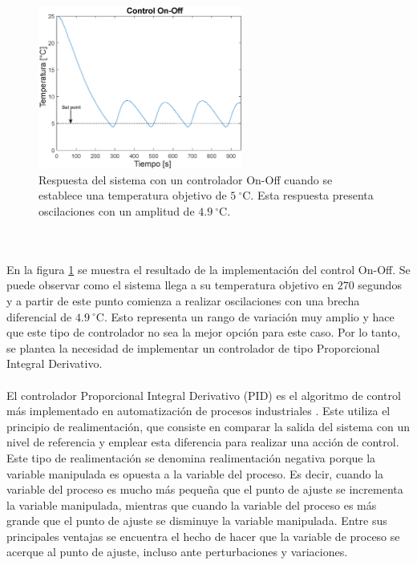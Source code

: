 \begin{figure}[h!]
\begin{centering}
  \includegraphics[width=0.6\textwidth]{Images/ControlOnOff.eps}
    \caption{Respuesta del sistema con un controlador On-Off cuando se establece una temperatura objetivo de $5~^\circ \mbox{C}$. Esta respuesta presenta oscilaciones con un amplitud de $4.9~^\circ \mbox{C}$.}
    \label{fig:ControlOnOff}
  \par\end{centering}
\end{figure}
\\ \\
En la figura \ref{fig:ControlOnOff} se muestra el resultado de la implementación del control On-Off. Se puede observar como el sistema llega a su temperatura objetivo en $270$ segundos y a partir de este punto comienza a realizar oscilaciones con una brecha diferencial de $4.9~^\circ \mbox{C}$. Esto representa un rango de variación muy amplio y hace que este tipo de controlador no sea la mejor opción para este caso. Por lo tanto, se plantea la necesidad de implementar un controlador de tipo Proporcional Integral Derivativo.\\ \\
El controlador  Proporcional Integral Derivativo (PID) es el algoritmo de control más implementado en automatización de procesos industriales \citep{Astrom}. Este  utiliza el principio de realimentación, que consiste en comparar la salida del sistema con un nivel de referencia y emplear esta diferencia para realizar una acción de control. Este tipo de realimentación se denomina realimentación negativa porque la variable manipulada es opuesta a la variable del proceso. Es decir, cuando la variable del proceso es mucho más pequeña que el punto de ajuste se incrementa la variable manipulada, mientras que cuando la variable del proceso es más grande que el punto de ajuste se disminuye la variable manipulada. Entre sus principales ventajas se encuentra el hecho de hacer que la variable  de proceso se acerque al punto de ajuste,  incluso ante perturbaciones y variaciones.\\ \\
